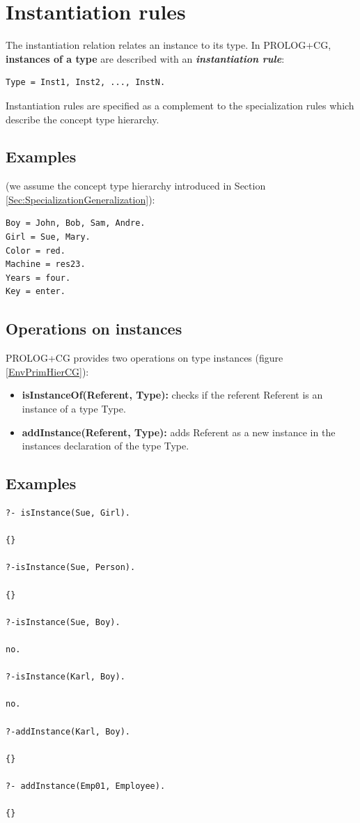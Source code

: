 \documentclass{book}
\begin{document}
\section{Instantiation rules}\label{Sec:Instantiation}

The instantiation relation relates an instance to its type. In
PROLOG+CG, {\bf instances of a type} are described with an
{\bf {\it instantiation rule}}:

\begin{verbatim}
Type = Inst1, Inst2, ..., InstN.
\end{verbatim}

Instantiation rules are specified as a complement to the
specialization rules which describe the concept type hierarchy.

\subsection{Examples}

(we assume the concept type hierarchy introduced in Section
\ref{Sec:SpecializationGeneralization}):


\begin{verbatim}
Boy = John, Bob, Sam, Andre.
Girl = Sue, Mary.
Color = red.
Machine = res23.
Years = four.
Key = enter.
\end{verbatim}


\subsection{Operations on instances} 

PROLOG+CG provides two operations on type instances (figure
\ref{EnvPrimHierCG}):

\begin{itemize}
  \item {\bf isInstanceOf(Referent, Type):} checks if the
  referent Referent is an instance of a type Type.

  \item {\bf addInstance(Referent, Type):} adds Referent as a
  new instance in the instances declaration of the type Type.

\end{itemize}

\subsection{Examples}


\begin{verbatim}
?- isInstance(Sue, Girl).

{}

?-isInstance(Sue, Person).

{}

?-isInstance(Sue, Boy).

no.

?-isInstance(Karl, Boy).

no.

?-addInstance(Karl, Boy).

{}

?- addInstance(Emp01, Employee).

{}
\end{verbatim}
\end{document}
